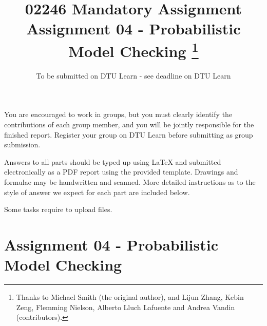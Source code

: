 \documentclass[12pt,a4paper]{article}
\title{02246 Mandatory Assignment\\
Assignment 04 - Probabilistic Model Checking \footnote{Thanks to Michael Smith (the original author), and Lijun Zhang, Kebin Zeng, Flemming Nielson, Alberto Lluch Lafuente and Andrea Vandin (contributors).}}
\date{To be submitted on DTU Learn - see deadline on DTU Learn}
\begin{document}
\maketitle

\noindent
You are encouraged to work in groups, 
but you must clearly identify the contributions of each group member, and you will be jointly responsible for the finished report. Register your group on DTU Learn before submitting as group submission. 
\par
Answers to all parts should be typed up using LaTeX and submitted electronically as a PDF report using the provided template. Drawings and formulae may be handwritten
and scanned. More detailed instructions as to the style of answer we expect for each part are included below.
\par
Some tasks require to upload files. %


\newif\ifwithanswers
\withanswerstrue


\pagebreak

\section*{Assignment 04 - Probabilistic Model Checking}
\end{document}
